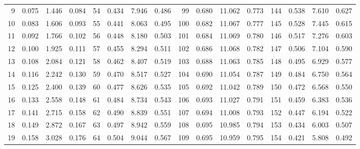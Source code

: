 \begin{table}[!h]
{\begin{tabular}{rrrr|rrrr|rrrr|rrrr}
  9 & \tiny{  0.075} &   1.446 & \tiny{  0.084} &  54 & \tiny{  0.434} &   7.946 & \tiny{  0.486} &  99 & \tiny{  0.680} &  11.062 & \tiny{  0.773} & 144 & \tiny{  0.538} &   7.610 & \tiny{  0.627}\\
 10 & \tiny{  0.083} &   1.606 & \tiny{  0.093} &  55 & \tiny{  0.441} &   8.063 & \tiny{  0.495} & 100 & \tiny{  0.682} &  11.067 & \tiny{  0.777} & 145 & \tiny{  0.528} &   7.445 & \tiny{  0.615}\\
 11 & \tiny{  0.092} &   1.766 & \tiny{  0.102} &  56 & \tiny{  0.448} &   8.180 & \tiny{  0.503} & 101 & \tiny{  0.684} &  11.069 & \tiny{  0.780} & 146 & \tiny{  0.517} &   7.276 & \tiny{  0.603}\\
 12 & \tiny{  0.100} &   1.925 & \tiny{  0.111} &  57 & \tiny{  0.455} &   8.294 & \tiny{  0.511} & 102 & \tiny{  0.686} &  11.068 & \tiny{  0.782} & 147 & \tiny{  0.506} &   7.104 & \tiny{  0.590}\\
 13 & \tiny{  0.108} &   2.084 & \tiny{  0.121} &  58 & \tiny{  0.462} &   8.407 & \tiny{  0.519} & 103 & \tiny{  0.688} &  11.063 & \tiny{  0.785} & 148 & \tiny{  0.495} &   6.929 & \tiny{  0.577}\\
 14 & \tiny{  0.116} &   2.242 & \tiny{  0.130} &  59 & \tiny{  0.470} &   8.517 & \tiny{  0.527} & 104 & \tiny{  0.690} &  11.054 & \tiny{  0.787} & 149 & \tiny{  0.484} &   6.750 & \tiny{  0.564}\\
 15 & \tiny{  0.125} &   2.400 & \tiny{  0.139} &  60 & \tiny{  0.477} &   8.626 & \tiny{  0.535} & 105 & \tiny{  0.692} &  11.042 & \tiny{  0.789} & 150 & \tiny{  0.472} &   6.568 & \tiny{  0.550}\\
 16 & \tiny{  0.133} &   2.558 & \tiny{  0.148} &  61 & \tiny{  0.484} &   8.734 & \tiny{  0.543} & 106 & \tiny{  0.693} &  11.027 & \tiny{  0.791} & 151 & \tiny{  0.459} &   6.383 & \tiny{  0.536}\\
 17 & \tiny{  0.141} &   2.715 & \tiny{  0.158} &  62 & \tiny{  0.490} &   8.839 & \tiny{  0.551} & 107 & \tiny{  0.694} &  11.008 & \tiny{  0.793} & 152 & \tiny{  0.447} &   6.194 & \tiny{  0.522}\\
 18 & \tiny{  0.149} &   2.872 & \tiny{  0.167} &  63 & \tiny{  0.497} &   8.942 & \tiny{  0.559} & 108 & \tiny{  0.695} &  10.985 & \tiny{  0.794} & 153 & \tiny{  0.434} &   6.003 & \tiny{  0.507}\\
 19 & \tiny{  0.158} &   3.028 & \tiny{  0.176} &  64 & \tiny{  0.504} &   9.044 & \tiny{  0.567} & 109 & \tiny{  0.695} &  10.959 & \tiny{  0.795} & 154 & \tiny{  0.421} &   5.808 & \tiny{  0.492}\\

\end{tabular}}
\end{table}
